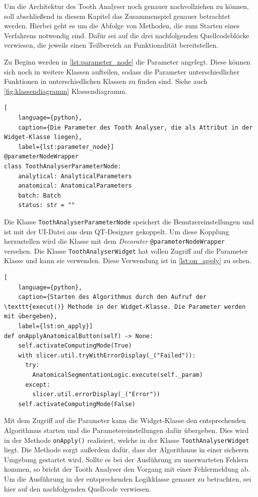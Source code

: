 Um die Architektur des Tooth Analyser noch genauer nachvollziehen zu können,
soll abschließend in diesem Kapitel das Zusammenspiel genauer betrachtet werden.
Hierbei geht es um die Abfolge von Methoden, die zum Starten eines Verfahrens
notwendig sind. Dafür sei auf die drei nachfolgenden Quellcodeblöcke verwiesen,
die jeweils einen Teilbereich an Funktionalität bereitstellen.

Zu Beginn werden in \ref{lst:parameter_node} die Parameter angelegt. Diese können
sich noch in weitere Klassen aufteilen, sodass die Parameter unterschiedlicher
Funktionen in unterschiedlichen Klassen zu finden sind. Siehe auch \ref{fig:klassendiagramm}
Klassendiagramm.

\begin{lstlisting}[
    language={python},
    caption={Die Parameter des Tooth Analyser, die als Attribut in der Widget-Klasse liegen},
    label={lst:parameter_node}]
@parameterNodeWrapper
class ToothAnalyserParameterNode:
    analytical: AnalyticalParameters
    anatomical: AnatomicalParameters
    batch: Batch
    status: str = ""
\end{lstlisting}

Die Klasse \texttt{ToothAnalyserParameterNode} speichert die Benutzereinstellungen
und ist mit der UI-Datei aus dem QT-Designer gekoppelt. Um diese Kopplung
herzustellen wird die Klasse mit dem \textit{Decorater} \texttt{@parameterNodeWrapper}
versehen. Die Klasse \texttt{ToothAnalyserWidget} hat vollen Zugriff auf die
Parameter Klasse und kann sie verwenden. Diese Verwendung ist in \ref{lst:on_apply}
zu sehen.

\begin{lstlisting}[
    language={python},
    caption={Starten des Algorithmus durch den Aufruf der \texttt{execut()} Methode in der Widget-Klasse. Die Parameter werden mit übergeben},
    label={lst:on_apply}]
def onApplyAnatomicalButton(self) -> None:
    self.activateComputingMode(True)
    with slicer.util.tryWithErrorDisplay(_("Failed")):
	  try:
	    AnatomicalSegmentationLogic.execute(self._param)
	  except:
	    slicer.util.errorDisplay(_("Error"))
    self.activateComputingMode(False)
\end{lstlisting}

Mit dem Zugriff auf die Parameter kann die Widget-Klasse den entsprechenden
Algorithmus starten und die Parametereinstellungen dafür übergeben. Dies wird in
der Methode \texttt{onApply()} realisiert, welche in der Klasse \texttt{ToothAnalyserWidget}
liegt. Die Methode sorgt außerdem dafür, dass der Algorithmus in einer sicheren
Umgebung gestartet wird. Sollte es bei der Ausführung zu unerwarteten Fehlern kommen,
so bricht der Tooth Analyser den Vorgang mit einer Fehlermeldung ab. Um die Ausführung
in der entsprechenden Logikklasse genauer zu betrachten, sei hier auf den
nachfolgenden Quellcode verwiesen.

